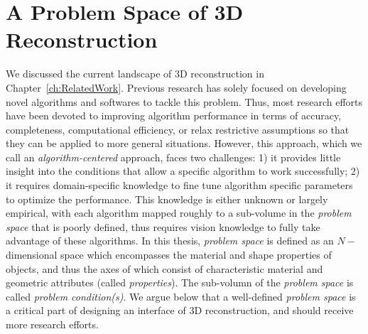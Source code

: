 
\chapter{A Problem Space of 3D Reconstruction}
\label{ch:3DRecon_ProbSpace}
We discussed the current landscape of 3D reconstruction in Chapter~\ref{ch:RelatedWork}. Previous research has solely focused on developing novel algorithms and softwares to tackle this problem. Thus, most research efforts have been devoted to improving algorithm performance in terms of accuracy, completeness, computational efficiency, or relax restrictive assumptions so that they can be applied to more general situations. However, this approach, which we call an \textit{algorithm-centered} approach, faces two challenges: 1) it provides little insight into the conditions that allow a specific algorithm to work successfully; 2) it requires domain-specific knowledge to fine tune algorithm specific parameters to optimize the performance. This knowledge is either unknown or largely empirical, with each algorithm mapped roughly to a sub-volume in the \textit{problem space} that is poorly defined, thus requires vision knowledge to fully take advantage of these algorithms. In this thesis, \textit{problem space} is defined as an $N-$dimensional space which encompasses the material and shape properties of objects, and thus the axes of which consist of characteristic material and geometric attributes (called \textit{properties}). The sub-volumn of the \textit{problem space} is called \textit{problem condition(s)}. We argue below that a well-defined \textit{problem space} is a critical part of designing an interface of 3D reconstruction, and should receive more research efforts.


